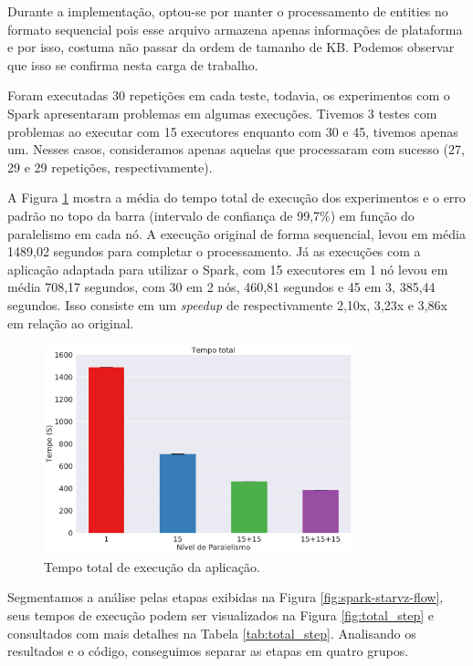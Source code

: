 Durante a implementação, optou-se por manter o processamento de entities
no formato sequencial pois esse arquivo armazena apenas informações de 
plataforma e por isso, costuma não passar da ordem de tamanho de KB. Podemos 
observar que isso se confirma nesta carga de trabalho.


Foram executadas 30 repetições em cada teste, todavia, os experimentos com o 
Spark apresentaram problemas em algumas execuções. Tivemos 3 testes com 
problemas ao executar com 15 executores enquanto com 30 e 45, tivemos apenas 
um. Nesses casos, consideramos apenas aquelas que processaram com sucesso (27, 
29 e 29 repetições, respectivamente). 

A Figura \ref{fig:total_full} mostra a média do tempo total de execução dos 
experimentos e o erro padrão no topo da barra (intervalo de confiança 
de 99,7\%) em função do paralelismo em cada nó. A execução original 
de forma sequencial, levou em média 1489,02 segundos para completar o 
processamento. Já as execuções com a aplicação adaptada para utilizar o Spark, 
com 15 executores em 1 nó levou em média 708,17 segundos, com 30 em 2 nós, 
460,81 segundos e 45 em 3, 385,44 segundos. Isso consiste em um \textit{speedup} 
de respectivamente 2,10x, 3,23x e 3,86x em relação ao original.

\begin{figure}[ht]
\centerline{
\includegraphics[width=0.8\textwidth]{./img/total.pdf}}
 \caption{Tempo total de execução da aplicação.}
 \label{fig:total_full}
\end{figure}


Segmentamos a análise pelas etapas exibidas na Figura 
\ref{fig:spark-starvz-flow}, seus tempos de execução podem ser visualizados na 
Figura \ref{fig:total_step} e consultados com mais detalhes na Tabela 
\ref{tab:total_step}. Analisando os resultados e o código, conseguimos 
separar as etapas em quatro grupos.

